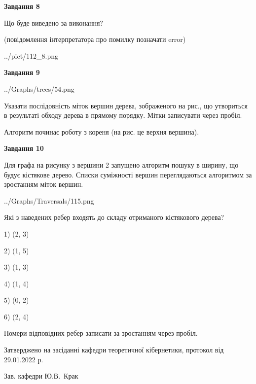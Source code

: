 \documentclass[12pt, ukrainian]{article}
\begin{document}
{\begin {large}
{\begin {center}\textbf{Завдання 8}\end {center}}\par
Що буде виведено за виконання?\par
 (повідомлення інтерпретатора про помилку позначати error)\par
\begin{center}
	{../pict/112_8.png}
\end{center}
\newpage

{\begin {center}\textbf{Завдання 9}\end {center}}\par

\begin{center}
	{../Graphs/trees/54.png}
\end{center}
Указати послідовність міток вершин дерева, зображеного на рис., що утвориться в результаті обходу дерева в прямому порядку. Мітки записувати через пробіл.\par Алгоритм починає роботу з кореня (на рис. це верхня вершина).\par
\newpage

{\begin {center}\textbf{Завдання 10}\end {center}}\par
Для графа на рисунку з вершини 2 запущено алгоритм пошуку в ширину, що будує кістякове дерево. Списки суміжності вершин переглядаються алгоритмом за зростанням міток вершин.\par
\begin{center}
	{../Graphs/Traversals/115.png}
\end{center}
\par Які з наведених ребер входять до складу отриманого кістякового дерева?\par
1) (2, 3)\par
2) (1, 5)\par
3) (1, 3)\par
4) (1, 4)\par
5) (0, 2)\par
6) (2, 4)\par
{\vskip 15pt} Номери відповідних ребер записати за зростанням через пробіл.\par
\newpage


\end {large}
}
{\smallskip \begin {small} Затверджено на засіданні кафедри теоретичної кібернетики, протокол  від   29.01.2022 р.\par\smallskip\smallskip
{\parbox {6.5 cm}{Зав. кафедри \dotfill Ю.В.~Крак}} \end{small}}
\end{document}
